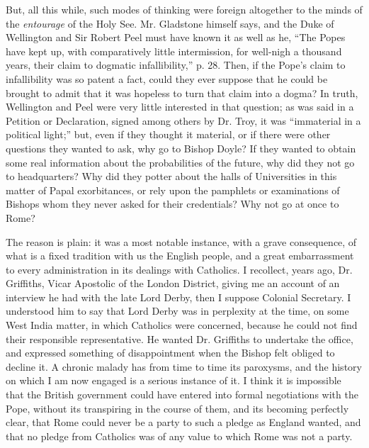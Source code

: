 But, all this while, such modes of thinking were foreign altogether
to the minds of the \emph{entourage} of the Holy See. Mr. Gladstone
himself says, and the Duke of Wellington and Sir Robert Peel must have
known it as well as he, ``The Popes have kept up, with comparatively
little intermission, for well-nigh a thousand years, their claim to
dogmatic infallibility,'' p. 28. Then, if the Pope's claim to
infallibility was so patent a fact, could they ever suppose that
he could be brought to admit that it was hopeless to turn that claim
into a dogma? In truth, Wellington and Peel were very little interested
in that question; as was said in a Petition or Declaration, signed among
others by Dr. Troy, it was ``immaterial in a political light;''
but, even if they thought it material, or if there were other questions
they wanted to ask, why go to Bishop Doyle? If they wanted to obtain
some real information about the probabilities of the future, why did
they not go to headquarters? Why did they potter about the halls of
Universities in this matter of Papal exorbitances, or rely upon the
pamphlets or examinations of Bishops whom they never asked for their
credentials? Why not go at once to Rome?

The reason is plain: it was a most notable instance, with a grave
consequence, of what is a fixed tradition with us the English people,
and a great embarrassment to every administration in its dealings with
Catholics. I recollect, years ago, Dr. Griffiths, Vicar Apostolic of the
London District, giving me an account of an interview he had with the
late Lord Derby, then I suppose Colonial Secretary. I understood him to
say that Lord Derby was in perplexity at the time, on some West India
matter, in which Catholics were concerned, because he could not find
their responsible representative. He wanted Dr. Griffiths to undertake
the office, and expressed something of disappointment when the Bishop
felt obliged to decline it. A chronic malady has from time to time its
paroxysms, and the history on which I am now engaged is a serious
instance of it. I think it is impossible that the British
government could have entered into formal negotiations with the Pope,
without its transpiring in the course of them, and its becoming
perfectly clear, that Rome could never be a party to such a pledge as
England wanted, and that no pledge from Catholics was of any value to
which Rome was not a party.

